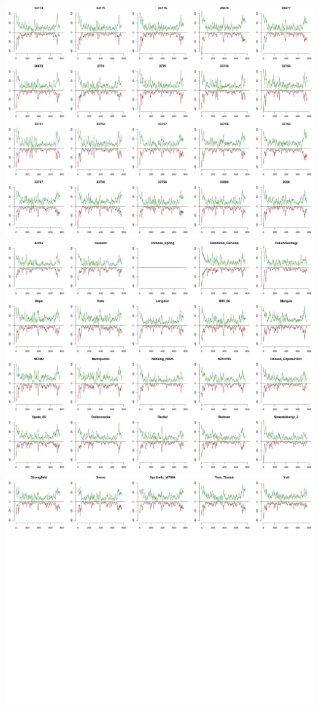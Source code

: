 \documentclass[a4paper, 12pt]{article}
\begin{document}
\centering \includegraphics[scale=0.28]{appendix/Appendix_5_1.jpg}
\newpage
\pagestyle{empty}
\centering \includegraphics[scale=0.28]{appendix/Appendix_5_2.jpg}
\centering \includegraphics[scale=0.28]{appendix/Appendix_5_3.jpg}
\end{document}
